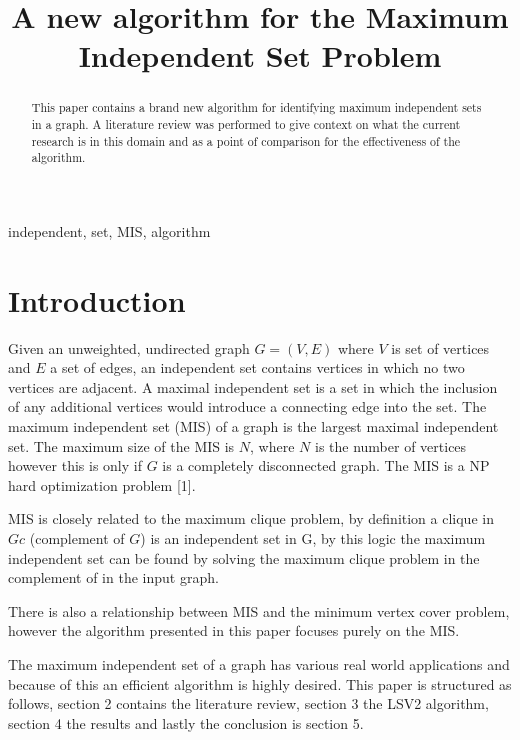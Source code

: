 \documentclass[conference]{IEEEtran}
\begin{document}
\title{A new algorithm for the Maximum Independent Set Problem}

\author{
}

\maketitle

\begin{abstract}
This paper contains a brand new algorithm for identifying maximum independent sets in a graph.
A literature review was performed to give context on what the current research is in this domain and as a point of 
comparison for the effectiveness of the algorithm.
\end{abstract}

\begin{IEEEkeywords}
independent, set, MIS, algorithm
\end{IEEEkeywords}

\section{Introduction}
Given an unweighted, undirected graph $G = (V, E)$ where $V$ is set of vertices and $E$ a set of edges, an 
independent set contains vertices in which no two vertices are adjacent. A maximal independent set is a set in 
which the inclusion of any additional vertices would introduce a connecting edge into the set. The maximum independent 
set (MIS) of a graph is the largest maximal independent set. The maximum size of the MIS is $N$, where $N$ is the number
of vertices however this is only if $G$ is a completely disconnected graph. The MIS is a NP hard optimization problem [1].

MIS is closely related to the maximum clique problem, by definition a clique in $Gc$ (complement of $G$) is an 
independent set in G, by this logic the maximum independent set can be found by solving the maximum clique problem in 
the complement of in the input graph. 

There is also a relationship between MIS and the minimum vertex cover problem, however the algorithm presented in this
paper focuses purely on the MIS.

The maximum independent set of a graph has various real world applications and because of this an efficient algorithm is 
highly desired. This paper is structured as follows, section 2 contains the literature review, section 3 the LSV2 algorithm, section 4 
the results and lastly the conclusion is section 5.
\end{document}
